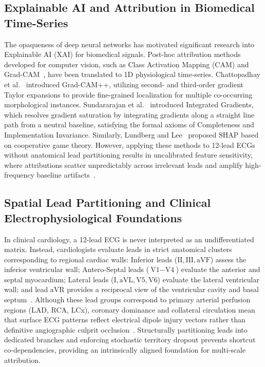 \documentclass[12pt]{elsarticle}
\begin{document}
\subsection{Explainable AI and Attribution in Biomedical Time-Series}
The opaqueness of deep neural networks has motivated significant research into Explainable AI (XAI) for biomedical signals. Post-hoc attribution methods developed for computer vision, such as Class Activation Mapping (CAM) and Grad-CAM~\cite{selvaraju2017grad}, have been translated to 1D physiological time-series. Chattopadhay et al.~\cite{chattopadhay2018grad} introduced Grad-CAM++, utilizing second- and third-order gradient Taylor expansions to provide fine-grained localization for multiple co-occurring morphological instances. Sundararajan et al.~\cite{sundararajan2017axiomatic} introduced Integrated Gradients, which resolves gradient saturation by integrating gradients along a straight line path from a neutral baseline, satisfying the formal axioms of Completeness and Implementation Invariance. Similarly, Lundberg and Lee~\cite{lundberg2017unified} proposed SHAP based on cooperative game theory. However, applying these methods to 12-lead ECGs without anatomical lead partitioning results in uncalibrated feature sensitivity, where attributions scatter unpredictably across irrelevant leads and amplify high-frequency baseline artifacts~\cite{ismail2020benchmarking, tonekaboni2020went}.

\subsection{Spatial Lead Partitioning and Clinical Electrophysiological Foundations}
In clinical cardiology, a 12-lead ECG is never interpreted as an undifferentiated matrix. Instead, cardiologists evaluate leads in strict anatomical clusters corresponding to regional cardiac walls: Inferior leads ($\text{II}, \text{III}, \text{aVF}$) assess the inferior ventricular wall; Antero-Septal leads ($\text{V1}-\text{V4}$) evaluate the anterior and septal myocardium; Lateral leads ($\text{I}, \text{aVL}, \text{V5}, \text{V6}$) evaluate the lateral ventricular wall; and lead $\text{aVR}$ provides a reciprocal view of the ventricular cavity and basal septum~\cite{wagner2020ptb, wagner2009aha}. Although these lead groups correspond to primary arterial perfusion regions (LAD, RCA, LCx), coronary dominance and collateral circulation mean that surface ECG patterns reflect electrical dipole injury vectors rather than definitive angiographic culprit occlusion~\cite{wagner2009aha}. Structurally partitioning leads into dedicated branches and enforcing stochastic territory dropout prevents shortcut co-dependencies, providing an intrinsically aligned foundation for multi-scale attribution.
\end{document}
